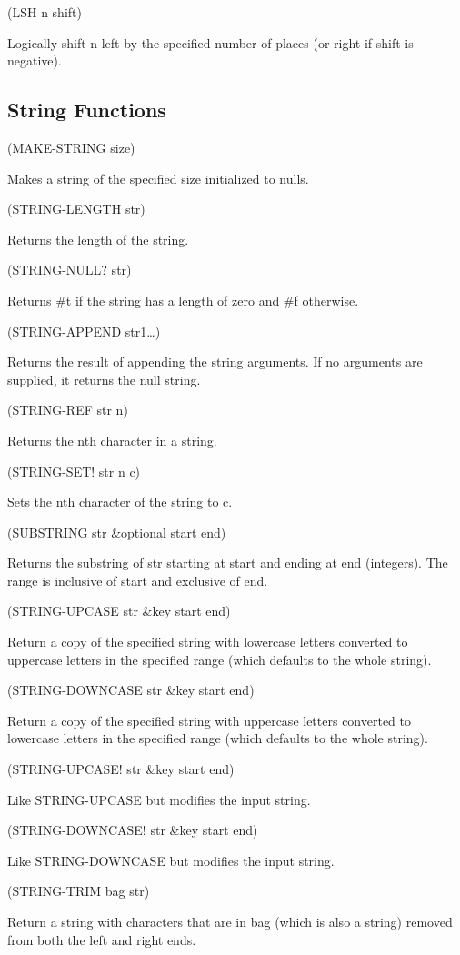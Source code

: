 \documentclass[11pt]{article}
\begin{document}
(LSH n shift)

Logically shift n left by the specified number of places (or right if
shift is negative).
\subsection{String Functions}
\label{sec-1-30}

(MAKE-STRING size)

Makes a string of the specified size initialized to nulls.

(STRING-LENGTH str)

Returns the length of the string.

(STRING-NULL? str)

Returns \#t if the string has a length of zero and \#f otherwise.

(STRING-APPEND str1\ldots{})

Returns the result of appending the string arguments. If no arguments
are supplied, it returns the null string.

(STRING-REF str n)

Returns the nth character in a string.

(STRING-SET! str n c)

Sets the nth character of the string to c.

(SUBSTRING str \&optional start end)

Returns the substring of str starting at start and ending at end
(integers). The range is inclusive of start and exclusive of end.

(STRING-UPCASE str \&key start end)

Return a copy of the specified string with lowercase letters converted
to uppercase letters in the specified range (which defaults to the whole
string).

(STRING-DOWNCASE str \&key start end)

Return a copy of the specified string with uppercase letters converted
to lowercase letters in the specified range (which defaults to the whole
string).

(STRING-UPCASE! str \&key start end)

Like STRING-UPCASE but modifies the input string.

(STRING-DOWNCASE! str \&key start end)

Like STRING-DOWNCASE but modifies the input string.

(STRING-TRIM bag str)

Return a string with characters that are in bag (which is also a string)
removed from both the left and right ends.
\end{document}
